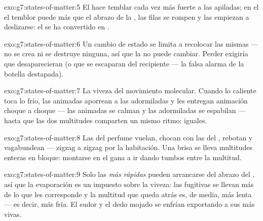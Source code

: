 \begin{solution}{exo:g7:states-of-matter:5}
El  hace temblar cada vez más fuerte a las 
apiladas; en el  el temblor puede más que el abrazo
de la , las filas se rompen y las  empiezan a
deslizarse: el  se ha convertido en .
\end{solution}

\begin{solution}{exo:g7:states-of-matter:6}
Un cambio de estado se limita a recolocar las mismas
 --- no se crea ni se destruye ninguna, así que la
 no puede cambiar. Perder  exigiría que
desaparecieran  (o que se escaparan del recipiente --- la
falsa alarma de la botella destapada).
\end{solution}

\begin{solution}{exo:g7:states-of-matter:7}
La viveza del movimiento molecular. Cuando lo caliente toca lo frío,
las  animadas aporrean a las adormiladas y les entregan
animación choque a choque --- las animadas se calman y las
adormiladas se espabilan --- hasta que las dos multitudes comparten un
mismo ritmo:  iguales.
\end{solution}

\begin{solution}{exo:g7:states-of-matter:8}
Las  del perfume vuelan, chocan con las 
del , rebotan y vagabundean --- zigzag a zigzag por la
habitación. Una brisa se lleva multitudes enteras en bloque: montarse
en el  gana a ir dando tumbos entre la multitud.
\end{solution}

\begin{solution}{exo:g7:states-of-matter:9}
Solo las  \emph{más rápidas} pueden arrancarse del abrazo
del , así que la evaporación es un impuesto sobre la viveza:
las fugitivas se llevan más de lo que les corresponde y la multitud
que queda atrás es, de media, más lenta --- es decir, más fría. El
sudor y el dedo mojado se enfrían exportando a sus más vivas.
\end{solution}

